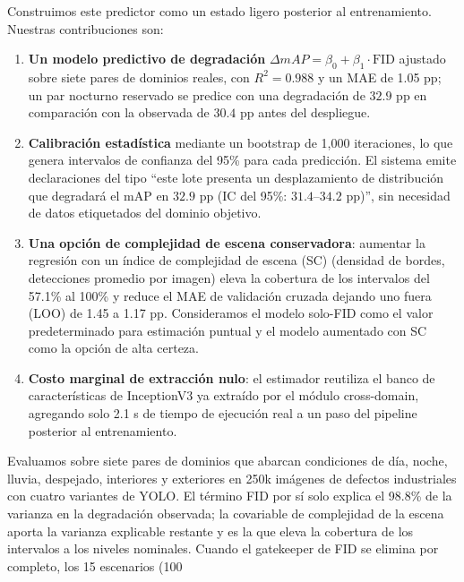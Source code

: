 \documentclass[10pt,twocolumn,letterpaper]{article}
\begin{document}
Construimos este predictor como un estado ligero posterior al entrenamiento. Nuestras contribuciones son:

\begin{enumerate}
    \item \textbf{Un modelo predictivo de degradación} $\Delta mAP = \beta_0 + \beta_1 \cdot \text{FID}$ ajustado sobre siete pares de dominios reales, con $R^2 = 0.988$ y un MAE de 1.05 pp; un par nocturno reservado se predice con una degradación de $32.9$ pp en comparación con la observada de $30.4$ pp antes del despliegue.
    \item \textbf{Calibración estadística} mediante un bootstrap de 1,000 iteraciones, lo que genera intervalos de confianza del 95\% para cada predicción. El sistema emite declaraciones del tipo ``este lote presenta un desplazamiento de distribución que degradará el mAP en $32.9$ pp (IC del 95\%: $31.4$--$34.2$ pp)'', sin necesidad de datos etiquetados del dominio objetivo.
    \item \textbf{Una opción de complejidad de escena conservadora}: aumentar la regresión con un índice de complejidad de escena (SC) (densidad de bordes, detecciones promedio por imagen) eleva la cobertura de los intervalos del 57.1\% al 100\% y reduce el MAE de validación cruzada dejando uno fuera (LOO) de 1.45 a 1.17 pp. Consideramos el modelo solo-FID como el valor predeterminado para estimación puntual y el modelo aumentado con SC como la opción de alta certeza.
    \item \textbf{Costo marginal de extracción nulo}: el estimador reutiliza el banco de características de InceptionV3 ya extraído por el módulo cross-domain, agregando solo 2.1 s de tiempo de ejecución real a un paso del pipeline posterior al entrenamiento.
\end{enumerate}

Evaluamos sobre siete pares de dominios que abarcan condiciones de día, noche, lluvia, despejado, interiores y exteriores en 250k imágenes de defectos industriales con cuatro variantes de YOLO. El término FID por sí solo explica el 98.8\% de la varianza en la degradación observada; la covariable de complejidad de la escena aporta la varianza explicable restante y es la que eleva la cobertura de los intervalos a los niveles nominales. Cuando el gatekeeper de FID se elimina por completo, los 15 escenarios (100%
\end{document}
